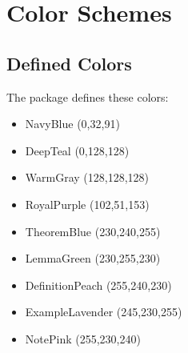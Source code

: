 \documentclass[a4paper]{book}
\begin{document}
\chapter{Color Schemes}

\section{Defined Colors}
The package defines these colors:
\begin{itemize}
\item NavyBlue (0,32,91)
\item DeepTeal (0,128,128)
\item WarmGray (128,128,128)
\item RoyalPurple (102,51,153)
\item TheoremBlue (230,240,255)
\item LemmaGreen (230,255,230)
\item DefinitionPeach (255,240,230)
\item ExampleLavender (245,230,255)
\item NotePink (255,230,240)
\end{itemize}
\end{document}
